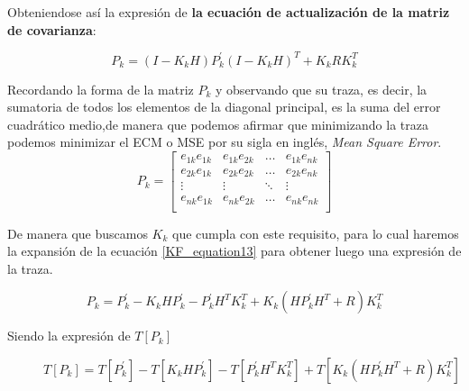 \documentclass[10pt,a4paper]{article}
\begin{document}
	Obteniendose así la expresión de \textbf{la ecuación de actualización de la matriz de covarianza}:
	
	\begin{figure}[h!]
		\begin{center}
			\begin{equation}
				P_k = (I-K_k H)P^\prime_k(I-K_k H)^T + K_k R K_k^T 
				\label{KF_equation13}
			\end{equation}	
		\end{center}
	\end{figure}
	
	\clearpage
	
	Recordando la forma de la matriz $P_k$ y observando que su traza, es decir, la sumatoria de todos los elementos de la diagonal principal, es la suma del error cuadrático medio,de manera que podemos afirmar que minimizando la traza podemos minimizar el ECM o MSE por su sigla en inglés, \emph{Mean Square Error}.
	\begin{equation}
		P_k = 
		\begin{bmatrix}
			e_{1k}e_{1k} & e_{1k}e_{2k} &	\dots  & e_{1k}e_{nk} \\
			e_{2k}e_{1k} & e_{2k}e_{2k} &	\dots  & e_{2k}e_{nk} \\
			\vdots       &   \vdots     &	\ddots & \vdots       \\
			e_{nk}e_{1k} & e_{nk}e_{2k} &	\dots  & e_{nk}e_{nk} \\
		\end{bmatrix}
	\end{equation}
	
	De manera que buscamos $K_k$ que cumpla con este requisito, para lo cual haremos la expansión de la ecuación \ref{KF_equation13}  para obtener luego una expresión de la traza.
	
	
	\begin{figure}[h!]
		\begin{center}
			\begin{equation}
				P_k = P^\prime_k - K_k H P^\prime_k - P^\prime_k H^T K^T_k + K_k (H P^\prime_k H^T + R) K^T_k
				\label{KF_equation14}
			\end{equation}	
		\end{center}
	\end{figure}
	
	Siendo la expresión de $T[P_k]$
	
	\begin{figure}[h!]
		\begin{center}
			\begin{equation}
				T[P_k] = T[P^\prime_k] - T[K_k H P^\prime_k] - T[P^\prime_k H^T K^T_k] + T[K_k (H P^\prime_k H^T + R) K^T_k]
				\label{KF_equation15}
			\end{equation}	
		\end{center}
	\end{figure}
	
\end{document}
